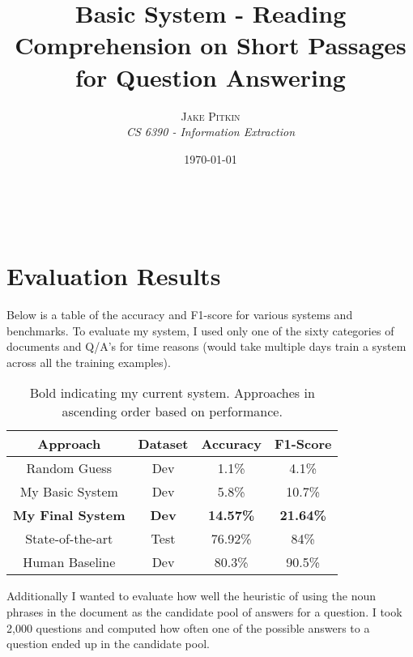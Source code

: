 \documentclass[a4paper, 11pt]{article} %
\title{\textbf{Basic System - Reading Comprehension on Short Passages for Question Answering}\\ %
} %
\author{\textsc{Jake Pitkin} %
\\{\textit{CS 6390 - Information Extraction}}} %
\date{\today} %
\makeatletter
\renewcommand{\maketitle}{ %
\begin{flushright} %
{\LARGE\@title} %

\vspace{50pt} %

{\large\@author} %
\\\@date %

\vspace{40pt} %
\end{flushright}
}
\makeatother
\begin{document}
\maketitle %




 

\section*{Evaluation Results}

Below is a table of the accuracy and F1-score for various systems and benchmarks. To evaluate my system, I used only one of the sixty categories of documents and Q/A's for time reasons (would take multiple days train a system across all the training examples).

\begin{table}[H]
\centering
{\renewcommand{\arraystretch}{1.2}%
\begin{tabular}{| c | c | c | c |}
\hline
Approach & Dataset & Accuracy & F1-Score\\
\hline
Random Guess & Dev & 1.1\% & 4.1\%\\ \hline
My Basic System  & Dev & 5.8\% & 10.7\%\\ \hline
\textbf{My Final System} & \textbf{Dev} & \textbf{14.57\%} & \textbf{21.64\%} \\ \hline
State-of-the-art & Test & 76.92\% & 84\% \\ \hline
Human Baseline & Dev & 80.3\% & 90.5\%\\ \hline
\end{tabular}}
\caption{Bold indicating my current system. Approaches in ascending order based on performance.}
\end{table}

Additionally I wanted to evaluate how well the heuristic of using the noun phrases in the document as the candidate pool of answers for a question. I took 2,000 questions and computed how often one of the possible answers to a question ended up in the candidate pool.
\end{document}
